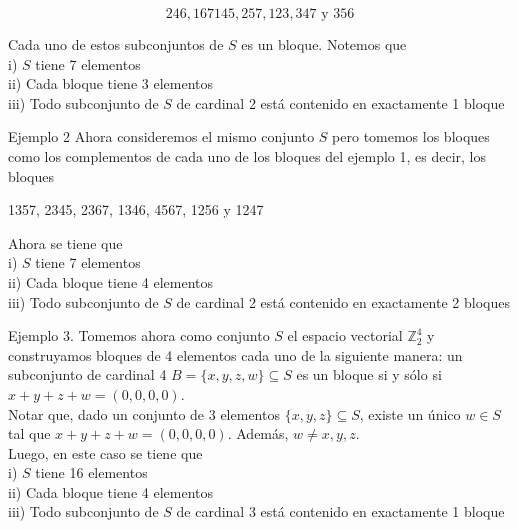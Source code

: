 \documentclass[10pt]{article}
\begin{document}
$$
246,167145,257,123,347 \text { y } 356
$$

Cada uno de estos subconjuntos de $S$ es un bloque. Notemos que\\
i) $S$ tiene 7 elementos\\
ii) Cada bloque tiene 3 elementos\\
iii) Todo subconjunto de $S$ de cardinal 2 está contenido en exactamente 1 bloque

Ejemplo 2 Ahora consideremos el mismo conjunto $S$ pero tomemos los bloques como los complementos de cada uno de los bloques del ejemplo 1, es decir, los bloques

1357, 2345, 2367, 1346, 4567, 1256 y 1247

Ahora se tiene que\\
i) $S$ tiene 7 elementos\\
ii) Cada bloque tiene 4 elementos\\
iii) Todo subconjunto de $S$ de cardinal 2 está contenido en exactamente 2 bloques

Ejemplo 3. Tomemos ahora como conjunto $S$ el espacio vectorial $\mathbb{Z}_{2}^{4}$ y construyamos bloques de 4 elementos cada uno de la siguiente manera: un subconjunto de cardinal 4 $B=\{x, y, z, w\} \subseteq S$ es un bloque si y sólo si $x+y+z+w=(0,0,0,0)$.\\
Notar que, dado un conjunto de 3 elementos $\{x, y, z\} \subseteq S$, existe un único $w \in S$ tal que $x+y+z+w=(0,0,0,0)$. Además, $w \neq x, y, z$.\\
Luego, en este caso se tiene que\\
i) $S$ tiene 16 elementos\\
ii) Cada bloque tiene 4 elementos\\
iii) Todo subconjunto de $S$ de cardinal 3 está contenido en exactamente 1 bloque
\end{document}
